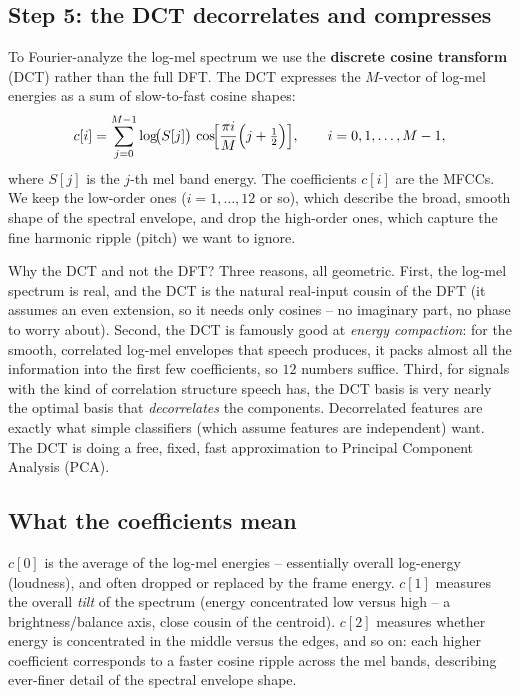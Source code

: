 \subsection*{Step 5: the DCT decorrelates and compresses}

To Fourier-analyze the log-mel spectrum we use the \textbf{discrete cosine
transform} (DCT) rather than the full DFT. The DCT expresses the $M$-vector of
log-mel energies as a sum of slow-to-fast cosine shapes:
\begin{equation}
\label{ch27:dct}
c[i] = \sum_{j=0}^{M-1} \log\!\bigl(S[j]\bigr)\,
       \cos\!\Bigl[\frac{\pi i}{M}\Bigl(j + \tfrac12\Bigr)\Bigr],
       \qquad i = 0, 1, \dots, M-1,
\end{equation}
where $S[j]$ is the $j$-th mel band energy. The coefficients $c[i]$ are the
MFCCs. We keep the low-order ones ($i = 1, \dots, 12$ or so), which describe the
broad, smooth shape of the spectral envelope, and drop the high-order ones, which
capture the fine harmonic ripple (pitch) we want to ignore.

\begin{whybox}
Why the DCT and not the DFT? Three reasons, all geometric. First, the log-mel
spectrum is real, and the DCT is the natural real-input cousin of the DFT (it
assumes an even extension, so it needs only cosines -- no imaginary part, no phase
to worry about). Second, the DCT is famously good at \emph{energy compaction}: for
the smooth, correlated log-mel envelopes that speech produces, it packs almost all
the information into the first few coefficients, so $12$ numbers suffice. Third,
for signals with the kind of correlation structure
speech has, the DCT basis is very nearly the optimal basis that \emph{decorrelates} the components. Decorrelated
features are exactly what simple classifiers (which assume features are independent)
want. The DCT is doing a free, fixed, fast approximation to Principal Component Analysis (PCA).
\end{whybox}

\subsection*{What the coefficients mean}

$c[0]$ is the average of the log-mel energies -- essentially overall log-energy
(loudness), and often dropped or replaced by the frame energy. $c[1]$ measures the
overall \emph{tilt} of the spectrum (energy concentrated low versus high -- a
brightness/balance axis, close cousin of the centroid). $c[2]$ measures whether
energy is concentrated in the middle versus the edges, and so on: each higher
coefficient corresponds to a faster cosine ripple across the mel bands, describing
ever-finer detail of the spectral envelope shape.

